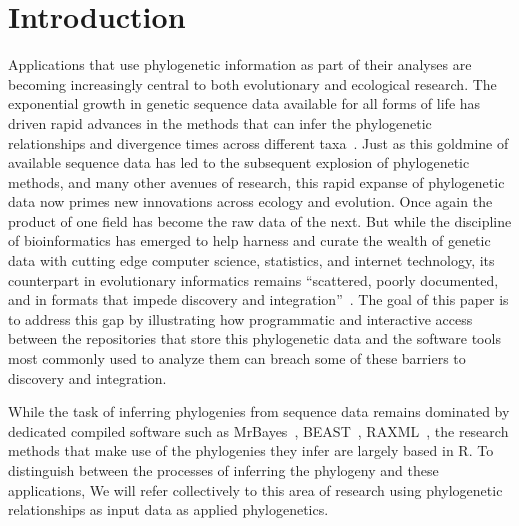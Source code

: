 \documentclass[authoryear, preprint]{elsarticle}
\begin{document}
\section{Introduction}
Applications that use phylogenetic information as part of their analyses 
are becoming increasingly central to both evolutionary and ecological research. 
The exponential growth in genetic sequence data available for all forms of life has 
driven rapid advances in the methods that can infer the phylogenetic relationships and divergence times 
across different taxa~\citep{Huelsenbeck2001b,Stamatakis2006, Drummond2007}.
Just as this goldmine of available sequence data has led to the subsequent explosion of phylogenetic methods,
and many other avenues of research, this rapid expanse of phylogenetic data now primes new innovations 
across ecology and evolution.  Once again the product of one field has become the raw data of the next.  
But while the discipline of bioinformatics has emerged to help harness and curate the wealth of genetic data
with cutting edge computer science, statistics, and internet technology, its counterpart in evolutionary informatics
remains ``scattered, poorly documented, and in formats that impede discovery and integration''~\citep{Parr2011a}.  
The goal of this paper is to address this gap by illustrating how programmatic and interactive access between the repositories that
store this phylogenetic data and the software tools most commonly used to analyze them can breach some of these barriers 
to discovery and integration.  

While the task of inferring phylogenies from sequence data remains dominated by dedicated compiled software such as MrBayes~\citep{Huelsenbeck2001b}, BEAST~\citep{Drummond2007}, RAXML~\citep{Stamatakis2006},
the research methods that make use of the phylogenies they infer are largely based in R. 
To distinguish between the processes of inferring the phylogeny and these applications,
We will refer collectively to this area of research using phylogenetic relationships as input data as applied phylogenetics.  
\end{document}
